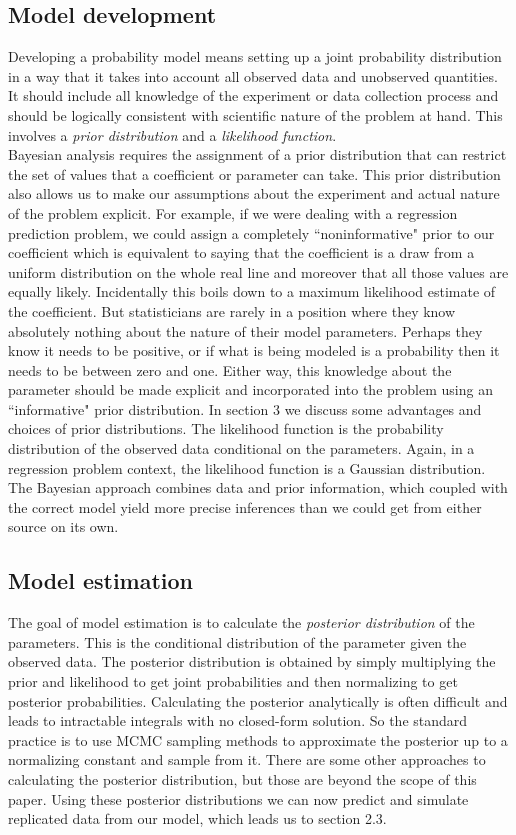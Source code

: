 \documentclass[12pt, oneside]{article}
\begin{document}
\subsection{Model development}
Developing a probability model means setting up a joint probability distribution in a way that it takes into account all observed data and unobserved quantities. It should include all knowledge of the experiment or data collection process and should be logically consistent with scientific nature of the problem at hand. This involves a \textit{prior distribution} and a \textit{likelihood function}.\\
 Bayesian analysis requires the assignment of a prior distribution that can restrict the set of values that a coefficient or parameter can take. This prior distribution also allows us to make our assumptions about the experiment and actual nature of the problem explicit. For example, if we were dealing with a regression prediction problem, we could assign a completely ``noninformative" prior to our coefficient which is equivalent to saying that the coefficient is a draw from a uniform distribution on the whole real line and moreover that all those values are equally likely. Incidentally this boils down to a maximum likelihood estimate of the coefficient. But statisticians are rarely in a position where they know absolutely nothing about the nature of their model parameters. Perhaps they know it needs to be positive, or if what is being modeled is a probability then it needs to be between zero and one. Either way, this knowledge about the parameter should be made explicit and incorporated into the problem using an ``informative" prior distribution. In section 3 we discuss some advantages and choices of prior distributions. The likelihood function is the probability distribution of the observed data conditional on the parameters. Again, in a regression problem context, the likelihood function is a Gaussian distribution.\\
The Bayesian approach combines data and prior information, which coupled with the correct model yield more precise inferences than we could get from either source on its own.



\subsection{Model estimation}
The goal of model estimation is to calculate the \textit{posterior distribution} of the parameters. This is the conditional distribution of the parameter given the observed data. The posterior distribution is obtained by simply multiplying the prior and likelihood to get joint probabilities and then normalizing to get posterior probabilities. Calculating the posterior analytically is often difficult and leads to intractable integrals with no closed-form solution. So the standard practice is to use MCMC sampling methods to approximate the posterior up to a normalizing constant and sample from it. There are some other approaches to calculating the posterior distribution, but those are beyond the scope of this paper. Using these posterior distributions we can now predict and simulate replicated data from our model, which leads us to section 2.3. 
\end{document}
